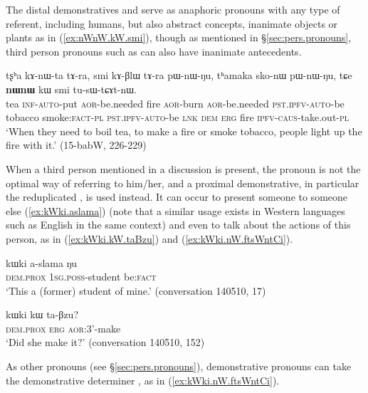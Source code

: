 The distal demonstratives  and  serve as anaphoric pronouns with any type of referent, including humans, but also abstract concepts, inanimate objects or plants as in (\ref{ex:nWnW.kW.smi}), though as mentioned in §\ref{sec:pers.pronouns},  third person pronouns such as  can also have inanimate antecedents.

\begin{exe}
\ex \label{ex:nWnW.kW.smi}
 \gll tʂʰa kɤ-nɯ-ta tɤ-ra, smi kɤ-βlɯ tɤ-ra pɯ-nɯ-ŋu, tʰamaka sko-nɯ pɯ-nɯ-ŋu, tɕe \textbf{nɯnɯ} kɯ smi tu-sɯ-tɕɤt-nɯ. \\
 tea \textsc{inf}-\textsc{auto}-put \textsc{aor}-be.needed fire  \textsc{aor}-burn \textsc{aor}-be.needed \textsc{pst}.\textsc{ipfv}-\textsc{auto}-be tobacco smoke:\textsc{fact}-\textsc{pl} \textsc{pst}.\textsc{ipfv}-\textsc{auto}-be \textsc{lnk} \textsc{dem} \textsc{erg} fire \textsc{ipfv}-\textsc{caus}-take.out-\textsc{pl} \\
 \glt `When they need to boil tea, to make a fire or smoke tobacco, people light up the fire with it.' (15-babW, 226-229)
\end{exe}

When a third person mentioned in a discussion is present, the pronoun  is not the optimal way of referring to him/her, and a proximal demonstrative, in particular the reduplicated , is used instead. It can occur to present someone to someone else (\ref{ex:kWki.aslama}) (note that a similar usage exists in Western languages such as English in the same context) and even to talk about the actions of this person, as in  (\ref{ex:kWki.kW.taBzu}) and (\ref{ex:kWki.nW.ftsWntCi}).

\begin{exe}
\ex \label{ex:kWki.aslama}
 \gll kɯki a-slama ŋu \\
\textsc{dem}.\textsc{prox} \textsc{1sg}.\textsc{poss}-student be:\textsc{fact} \\
\glt `This a (former) student of mine.' (conversation 140510, 17)
\end{exe}

\begin{exe}
\ex \label{ex:kWki.kW.taBzu}
 \gll  kɯki kɯ ta-βzu? \\
 \textsc{dem}.\textsc{prox} \textsc{erg} \textsc{aor}:3'-make \\
 \glt `Did she make it?' (conversation 140510, 152)
\end{exe}

As other pronouns (see §\ref{sec:pers.pronouns}), demonstrative pronouns can take the demonstrative determiner , as in (\ref{ex:kWki.nW.ftsWntCi}).


